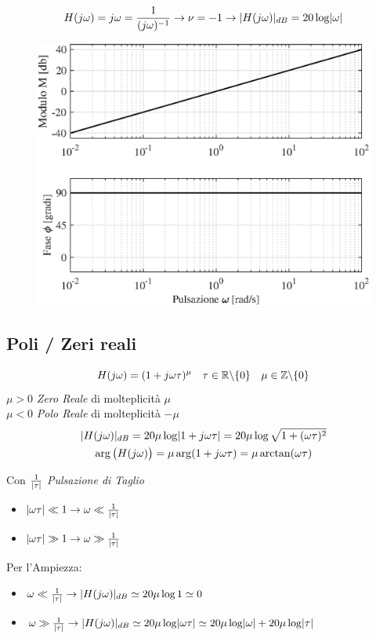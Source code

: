 \begin{nexample}
	\[ H(j\omega) =j\omega = \frac{1}{(j\omega)^{-1}} \rightarrow \nu = -1 \rightarrow \lvert H(j\omega)\rvert_{dB} = 20 \log \lvert\omega\rvert\]
\begin{figure}[H]
	\centering
	\includegraphics[width=0.7\linewidth]{immagini/cap6_Bode/es2.eps}
	\label{fig:Bode_es2}
\end{figure}
\end{nexample}

\subsection{Poli / Zeri reali}

\[ H(j\omega) = (1+j\omega\tau)^{\mu} \quad \tau \in \mathbb{R} \backslash \{0\} \quad \mu \in \mathbb{Z} \backslash \{0\}  \]
$ \mu>0 $ \emph{Zero Reale} di molteplicità $ \mu $\\
$ \mu<0 $ \emph{Polo Reale} di molteplicità $ -\mu $
\begin{gather*}
	\lvert H(j\omega)\rvert_{dB} = 20 \mu \log \lvert1+j\omega\tau\rvert = 20 \mu \log \sqrt{1+(\omega\tau)^2} \\
	\arg \big(H(j\omega)\big) = \mu \arg(1+j\omega\tau) = \mu \arctan(\omega\tau)
\end{gather*}

Con $ \frac{1}{\lvert\tau\rvert} $ \emph{Pulsazione di Taglio}
\begin{itemize}
	\item $ \lvert\omega\tau\rvert \ll 1 \rightarrow \omega \ll \frac{1}{\lvert\tau\rvert}$
	\item $ \lvert\omega\tau\rvert \gg 1 \rightarrow \omega \gg \frac{1}{\lvert\tau\rvert}$
\end{itemize}

Per l'Ampiezza:
\begin{itemize}
	\item $ \omega \ll \frac{1}{\lvert\tau\rvert} \rightarrow \lvert H(j\omega)\rvert_{dB} \simeq 20\mu \log 1 \simeq 0 $
	\item $ \omega \gg \frac{1}{\lvert\tau\rvert} \rightarrow \lvert H(j\omega)\rvert_{dB} \simeq 20\mu \log \lvert\omega\tau\rvert \simeq 20 \mu \log \lvert\omega\rvert +20 \mu \log \lvert\tau\rvert $
\end{itemize}

